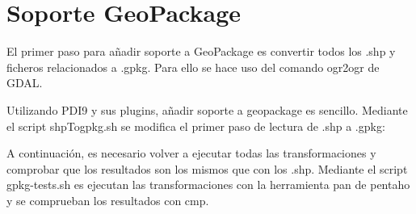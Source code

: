 \section{Soporte GeoPackage}

El primer paso para añadir soporte a GeoPackage es convertir todos los .shp y ficheros relacionados a .gpkg. Para
ello se hace uso del comando ogr2ogr de GDAL\cite{ogr2ogr}.

Utilizando PDI9 y sus plugins, añadir soporte a geopackage es sencillo. Mediante el script shpTogpkg.sh se
modifica el primer paso de lectura de .shp a .gpkg:



A continuación, es necesario volver a ejecutar todas las transformaciones y comprobar que los resultados son los
mismos que con los .shp. Mediante el script gpkg-tests.sh es ejecutan las transformaciones con la herramienta
pan de pentaho y se comprueban los resultados con cmp.


